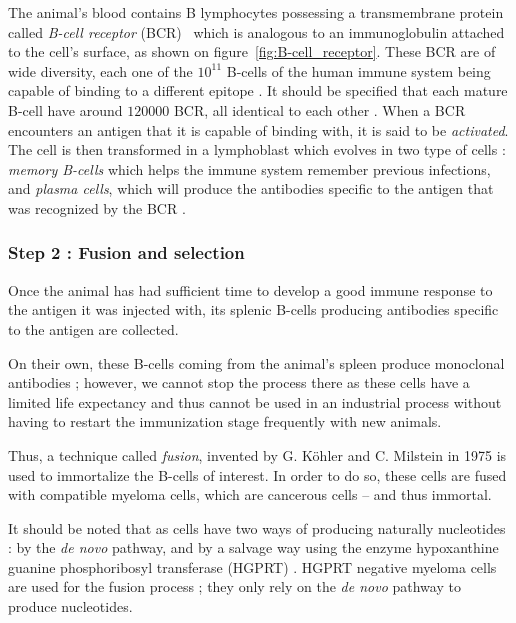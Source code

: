 The animal's blood contains B lymphocytes possessing a transmembrane protein
called \emph{B-cell receptor} (BCR)~\cite{seifert_human_2016} 
which is analogous to an immunoglobulin 
attached to the cell's surface, as shown on figure~\ref{fig:B-cell_receptor}.
These BCR are of wide diversity, each one of the $10^{11}$ B-cells of the human immune system 
being capable of binding to a different epitope \cite{reth_chapter_2015}.
It should be specified that each mature B-cell have around $120 000$ BCR,
all identical to each other \cite{reth_chapter_2015}.
When a BCR encounters an antigen that it is capable of binding
with, it is said to be \emph{activated}. The cell is then transformed in a 
lymphoblast which evolves in two type of cells : \emph{memory B-cells}
which helps the immune system remember previous infections, and 
\emph{plasma cells}, which will produce the antibodies specific to the antigen that
was recognized by the BCR \cite{levine_b-cell_2000}.


\subsubsection{Step 2 : Fusion and selection}

Once the animal has had sufficient time to develop a good immune
response to the antigen it was injected with, its splenic B-cells
producing antibodies specific to the antigen are collected.

On their own, these B-cells coming from the animal's spleen produce
monoclonal antibodies ; however, we cannot stop the process there
as these cells have a limited life expectancy and thus cannot be
used in an industrial process without having to restart the immunization
stage frequently with new animals.

Thus, a technique called \emph{fusion}, invented by G. Köhler and
C. Milstein in 1975 \cite{kohler_continuous_1975} is used to immortalize
the B-cells of interest. In order to do so, these cells are fused with
compatible myeloma cells, which are cancerous cells -- and thus immortal.

It should be noted that as cells have two ways of producing naturally
nucleotides : by the \emph{de novo} pathway, and by a salvage way using the enzyme
hypoxanthine guanine phosphoribosyl transferase (HGPRT) \cite{mckeran_use_1976}.
HGPRT negative myeloma cells are used for the fusion process ; they only rely
on the \emph{de novo} pathway to produce nucleotides.

